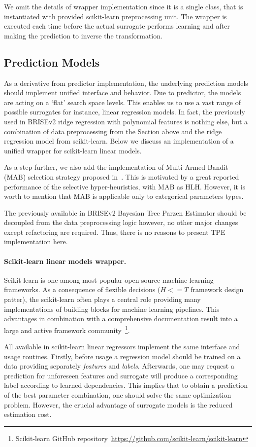 We omit the details of wrapper implementation since it is a single class, that is instantiated with provided scikit-learn preprocessing unit. The wrapper is executed each time before the actual surrogate performs learning and after making the prediction to inverse the transformation.


\subsection{Prediction Models}\label{impl: prediction models}
As a derivative from predictor implementation, the underlying prediction models should implement unified interface and behavior. Due to predictor, the models are acting on a `flat' search space levels. This enables us to use a vast range of possible surrogates for instance, linear regression models. In fact, the previously used in BRISEv2 ridge regression with polynomial features is nothing else, but a combination of data preprocessing from the Section above and the ridge regression model from scikit-learn. Below we discuss an implementation of a unified wrapper for scikit-learn linear models.

As a step further, we also add the implementation of Multi Armed Bandit (MAB) selection strategy proposed in~\cite{auer2002finite}. This is motivated by a great reported performance of the selective hyper-heuristics, with MAB as HLH. However, it is worth to mention that MAB is applicable only to categorical parameters types.

The previously available in BRISEv2 Bayesian Tree Parzen Estimator should be decoupled from the data preprocessing logic however, no other major changes except refactoring are required. Thus, there is no reasons to present TPE implementation here.

\paragraph{Scikit-learn linear models wrapper.}
Scikit-learn is one among most popular open-source machine learning frameworks. As a consequence of flexible decisions ($H<=T$ framework design patter), the scikit-learn often plays a central role providing many implementations of building blocks for machine learning pipelines. This advantages in combination with a comprehensive documentation result into a large and active framework community~\footnote{Scikit-learn GitHub repository~\url{https://github.com/scikit-learn/scikit-learn}}.

All available in scikit-learn linear regressors implement the same interface and usage routines. Firstly, before usage a regression model should be trained on a data providing separately \emph{features} and \emph{labels}. Afterwards, one may request a prediction for unforeseen features and surrogate will produce a corresponding label according to learned dependencies. This implies that to obtain a prediction of the best parameter combination, one should solve the same optimization problem. However, the crucial advantage of surrogate models is the reduced estimation cost.

